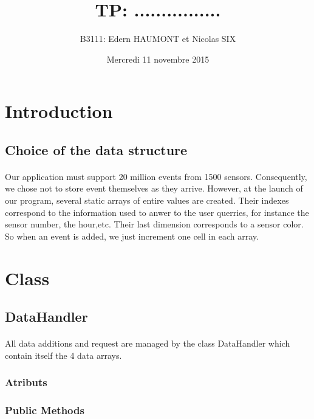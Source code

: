 \documentclass[a4paper, 12pts]{article}
\title{TP: ................}
\author{B3111: Edern HAUMONT et Nicolas SIX}
\date{Mercredi 11 novembre 2015}
\begin{document}
\begin{titlepage}

\maketitle

\end{titlepage}


\tableofcontents

\pagebreak


\section{Introduction}
\paragraph{}

\subsection{Choice of the data structure}
\paragraph{}
Our application must support 20 million events from 1500 sensors. Consequently, we chose not to store event themselves as they arrive. However, at the launch of our program, several static arrays of entire values are created. Their indexes correspond to the information used to anwer to the user querries, for instance the sensor number, the hour,etc. Their last dimension corresponds to a sensor color. So when an event is added, we just increment one cell in each array.

\section{Class}

\subsection{DataHandler}
\paragraph{}
All data additions and request are managed by the class DataHandler which contain itself the 4 data arrays.

\subsubsection{Atributs}

\subsubsection{Public Methods}
\end{document}
